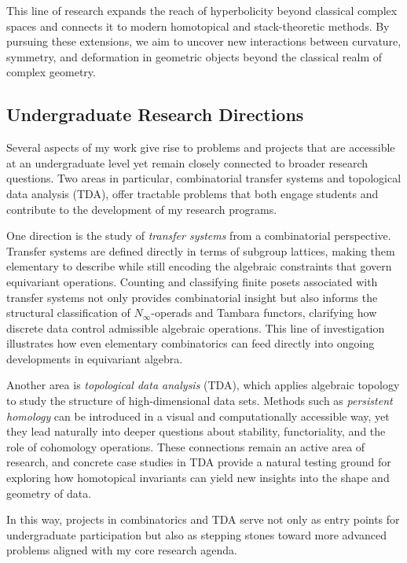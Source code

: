 \documentclass[11pt]{article}
\begin{document}
This line of research expands the reach of hyperbolicity beyond classical complex spaces and connects it to modern homotopical and stack-theoretic methods.
By pursuing these extensions, we aim to uncover new interactions between curvature, symmetry, and deformation in geometric objects beyond the classical realm of complex geometry.

\subsection*{Undergraduate Research Directions}
Several aspects of my work give rise to problems and projects that are accessible at an undergraduate level yet remain closely connected to broader research questions.
Two areas in particular, combinatorial transfer systems and topological data analysis (TDA), offer tractable problems that both engage students and contribute to the development of my research programs.

One direction is the study of {\it transfer systems} from a combinatorial perspective.
Transfer systems are defined directly in terms of subgroup lattices, making them elementary to describe while still encoding the algebraic constraints that govern equivariant operations.
Counting and classifying finite posets associated with transfer systems not only provides combinatorial insight but also informs the structural classification of $N_\infty$-operads and Tambara functors, clarifying how discrete data control admissible algebraic operations.
This line of investigation illustrates how even elementary combinatorics can feed directly into ongoing developments in equivariant algebra.

Another area is {\it topological data analysis} (TDA), which applies algebraic topology to study the structure of high-dimensional data sets.
Methods such as {\it persistent homology} can be introduced in a visual and computationally accessible way, yet they lead naturally into deeper questions about stability, functoriality, and the role of cohomology operations.
These connections remain an active area of research, and concrete case studies in TDA provide a natural testing ground for exploring how homotopical invariants can yield new insights into the shape and geometry of data.

In this way, projects in combinatorics and TDA serve not only as entry points for undergraduate participation but also as stepping stones toward more advanced problems aligned with my core research agenda.
\end{document}
